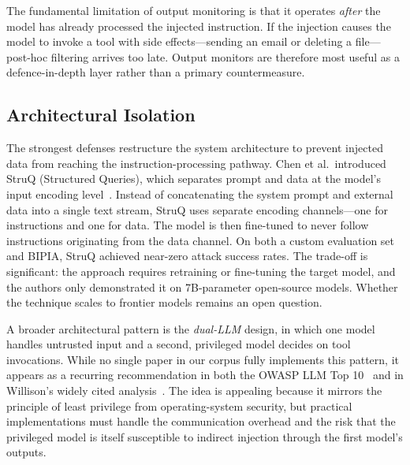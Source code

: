 The fundamental limitation of output monitoring is that it operates \emph{after} the model has already processed the injected instruction. If the injection causes the model to invoke a tool with side effects---sending an email or deleting a file---post-hoc filtering arrives too late. Output monitors are therefore most useful as a defence-in-depth layer rather than a primary countermeasure.

\subsection{Architectural Isolation}

The strongest defenses restructure the system architecture to prevent injected data from reaching the instruction-processing pathway. Chen et al.\ introduced StruQ (Structured Queries), which separates prompt and data at the model's input encoding level~\cite{chen2024struq}. Instead of concatenating the system prompt and external data into a single text stream, StruQ uses separate encoding channels---one for instructions and one for data. The model is then fine-tuned to never follow instructions originating from the data channel. On both a custom evaluation set and BIPIA, StruQ achieved near-zero attack success rates. The trade-off is significant: the approach requires retraining or fine-tuning the target model, and the authors only demonstrated it on 7B-parameter open-source models. Whether the technique scales to frontier models remains an open question.

A broader architectural pattern is the \emph{dual-LLM} design, in which one model handles untrusted input and a second, privileged model decides on tool invocations. While no single paper in our corpus fully implements this pattern, it appears as a recurring recommendation in both the OWASP LLM Top 10~\cite{owasp2025llm} and in Willison's widely cited analysis~\cite{willison2023prompt}. The idea is appealing because it mirrors the principle of least privilege from operating-system security, but practical implementations must handle the communication overhead and the risk that the privileged model is itself susceptible to indirect injection through the first model's outputs.
